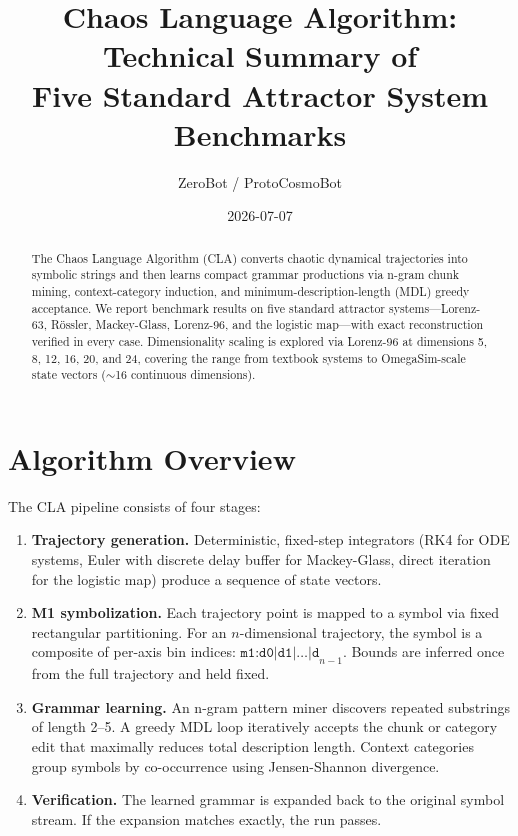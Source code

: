 \documentclass[11pt]{article}
\title{Chaos Language Algorithm: Technical Summary of\\ Five Standard Attractor System Benchmarks}
\author{ZeroBot / ProtoCosmoBot}
\date{2026-07-07}
\begin{document}
\maketitle

\begin{abstract}
The Chaos Language Algorithm (CLA) converts chaotic dynamical trajectories into symbolic strings and then learns compact grammar productions via n-gram chunk mining, context-category induction, and minimum-description-length (MDL) greedy acceptance. We report benchmark results on five standard attractor systems---Lorenz-63, R\"ossler, Mackey-Glass, Lorenz-96, and the logistic map---with exact reconstruction verified in every case. Dimensionality scaling is explored via Lorenz-96 at dimensions 5, 8, 12, 16, 20, and 24, covering the range from textbook systems to OmegaSim-scale state vectors ($\sim$16 continuous dimensions).
\end{abstract}

\section{Algorithm Overview}

The CLA pipeline consists of four stages:

\begin{enumerate}[noitemsep]
    \item \textbf{Trajectory generation.} Deterministic, fixed-step integrators (RK4 for ODE systems, Euler with discrete delay buffer for Mackey-Glass, direct iteration for the logistic map) produce a sequence of state vectors.
    \item \textbf{M1 symbolization.} Each trajectory point is mapped to a symbol via fixed rectangular partitioning. For an $n$-dimensional trajectory, the symbol is a composite of per-axis bin indices: $\texttt{m1:d0|d1|}\ldots\texttt{|d}_{n-1}$. Bounds are inferred once from the full trajectory and held fixed.
    \item \textbf{Grammar learning.} An n-gram pattern miner discovers repeated substrings of length 2--5. A greedy MDL loop iteratively accepts the chunk or category edit that maximally reduces total description length. Context categories group symbols by co-occurrence using Jensen-Shannon divergence.
    \item \textbf{Verification.} The learned grammar is expanded back to the original symbol stream. If the expansion matches exactly, the run passes.
\end{enumerate}
\end{document}
